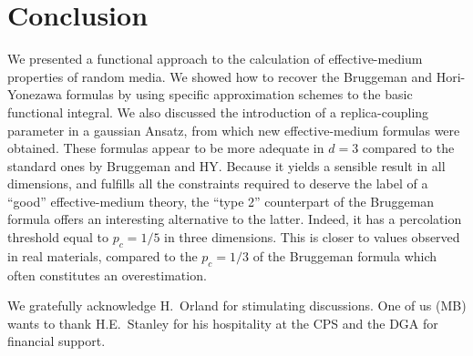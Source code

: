 \section{Conclusion}
\label{c}

We presented a functional approach to the calculation of
effective-medium properties of random media. We showed how to recover
the Bruggeman and Hori-Yonezawa formulas by using specific
approximation schemes to the basic functional integral.  We also
discussed the introduction of a replica-coupling parameter in a
gaussian Ansatz, from which new effective-medium formulas were
obtained. These formulas appear to be more adequate in $d=3$ compared
to the standard ones by Bruggeman and HY. Because it yields a
sensible result in all dimensions, and fulfills all the constraints
required to deserve the label of a ``good'' effective-medium theory,
the ``type 2'' counterpart of the Bruggeman formula offers an
interesting alternative to the latter. Indeed, it has a percolation
threshold equal to $p_c=1/5$ in three dimensions. This is closer to
values observed in real materials, compared to the $p_c=1/3$ of the
Bruggeman formula which often constitutes an overestimation.

\acknowledgements

We gratefully acknowledge H.~Orland for stimulating discussions. One
of us (MB) wants to thank H.E.~Stanley for his hospitality at the CPS
and the DGA for financial support.

\appendix
